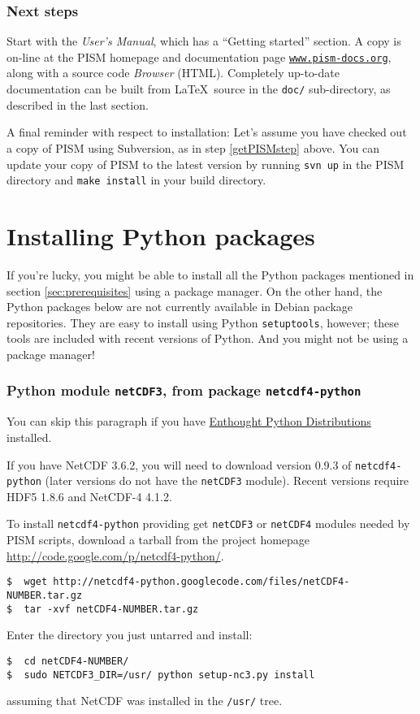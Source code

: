\documentclass[11pt,final]{amsart}
\renewcommand{\t}[1]{\texttt{#1}}
\begin{document}
\subsubsection*{Next steps}  Start with the \emph{User's Manual}, which has a ``Getting started'' section.  A copy is on-line at the PISM homepage and documentation page \href{http://www.pism-docs.org/}{\t{www.pism-docs.org}}, along with a source code \emph{Browser} (HTML).  Completely up-to-date documentation can be built from \LaTeX~source in the \texttt{doc/} sub-directory, as described in the last section.

A final reminder with respect to installation:  Let's assume you have checked out a copy of PISM using Subversion, as in step
\ref{getPISMstep} above.  You can update your copy of PISM to the latest version by running \texttt{svn up} in the PISM directory
and \texttt{make install} in your build directory.


\newpage
\section{Installing Python packages}
\label{sec:python}

If you're lucky, you might be able to install all the Python packages mentioned in section \ref{sec:prerequisites} using a package manager. On the other hand, the Python packages below are not currently available in Debian package repositories. They are easy to install using Python \texttt{setuptools}, however; these tools are included with recent versions of Python.  And you might not be using a package manager!

\subsubsection*{Python module \texttt{netCDF3}, from package \texttt{netcdf4-python}}  You can skip this paragraph if you have
\href{http://www.enthought.com/}{Enthought Python Distributions} installed.

If you have NetCDF 3.6.2, you will need to download version 0.9.3 of \texttt{netcdf4-python} (later versions do not have the
\texttt{netCDF3} module). Recent versions require HDF5 1.8.6 and NetCDF-4 4.1.2.

To install \texttt{netcdf4-python} providing get \texttt{netCDF3} or \texttt{netCDF4} modules needed by PISM scripts, download a
tarball from the project homepage \url{http://code.google.com/p/netcdf4-python/}.

\begin{verbatim}
$  wget http://netcdf4-python.googlecode.com/files/netCDF4-NUMBER.tar.gz
$  tar -xvf netCDF4-NUMBER.tar.gz
\end{verbatim}
Enter the directory you just untarred and install:
\begin{verbatim}
$  cd netCDF4-NUMBER/
$  sudo NETCDF3_DIR=/usr/ python setup-nc3.py install
\end{verbatim}
assuming that NetCDF was installed in the \texttt{/usr/} tree.
\end{document}
